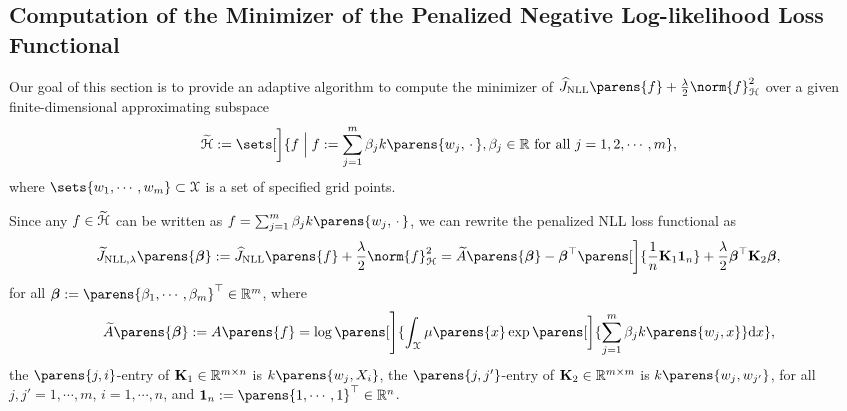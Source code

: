 \subsection{Computation of the Minimizer of the Penalized Negative Log-likelihood Loss Functional}

Our goal of this section is to provide an adaptive algorithm to compute the minimizer of $\widehat{J}_{\NLL} \parens{f} + \frac{\lambda}{2} \norm{f}_{\calH}^2$ over a given finite-dimensional approximating subspace 
\begin{align*}
	\widetilde{\calH} := \sets[\bigg]{f \Bigm| f := \sum_{j=1}^m \beta_j k \parens{w_j, \,\cdot\,}, \beta_j \in \Real \text{ for all } j = 1, 2, \cdots, m}, 
\end{align*}
where $\sets{w_1, \cdots, w_m} \subset \calX$ is a set of specified grid points. 

Since any $f \in \widetilde{\mathcal{H}}$ can be written as $f = \sum_{j=1}^m \beta_j k \parens{w_j, \,\cdot\,}$, we can rewrite the penalized NLL loss functional as 
\begin{align}\label{eq-nll-opt-problem-beta}
	\widetilde{J}_{\NLL, \lambda} \parens{\bbeta} := \widehat{J}_{\NLL} \parens{f} + \frac{\lambda}{2} \norm{f}_{\calH}^2 = \widetilde{A} \parens{\bbeta} - \bbeta^\top \parens[\bigg]{\frac{1}{n} \bK_1 \boldone_n} + \frac{\lambda}{2} \bbeta^\top \bK_2 \bbeta, 
\end{align}
for all $\bbeta := \parens{\beta_1, \cdots, \beta_m}^\top \in \Real^m$, where 
\begin{align*}
	\widetilde{A} \parens{\bbeta} := A \parens{f} = 
	\log \parens[\Bigg]{\int_{\calX} \mu \parens{x} \exp \parens[\bigg]{\sum_{j=1}^m \beta_j k \parens{w_j, x} } \diff x}, 
\end{align*}
the $\parens{j, i}$-entry of $\mathbf{K}_1 \in \mathbb{R}^{m \times n}$ is $k \parens{w_j, X_i}$, the $\parens{j, j'}$-entry of $\mathbf{K}_2 \in \mathbb{R}^{m \times m}$ is $k \parens{w_{j}, w_{j'}}$, for all $j, j' = 1, \cdots, m$, $i = 1, \cdots, n$, and $\boldone_n := \parens{1, \cdots, 1}^\top \in \Real^n$. 

